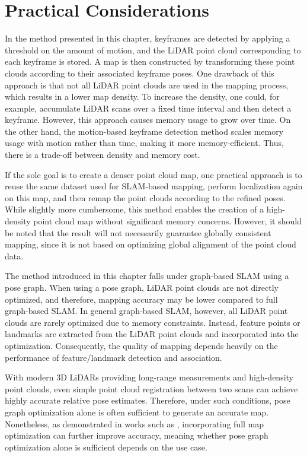 \section{Practical Considerations}

In the method presented in this chapter, keyframes are detected by applying a threshold on the amount of motion, and the LiDAR point cloud corresponding to each keyframe is stored.
A map is then constructed by transforming these point clouds according to their associated keyframe poses.
One drawback of this approach is that not all LiDAR point clouds are used in the mapping process, which results in a lower map density.
To increase the density, one could, for example, accumulate LiDAR scans over a fixed time interval and then detect a keyframe.
However, this approach causes memory usage to grow over time.
On the other hand, the motion-based keyframe detection method scales memory usage with motion rather than time, making it more memory-efficient.
Thus, there is a trade-off between density and memory cost.

If the sole goal is to create a denser point cloud map, one practical approach is to reuse the same dataset used for SLAM-based mapping, perform localization again on this map, and then remap the point clouds according to the refined poses.
While slightly more cumbersome, this method enables the creation of a high-density point cloud map without significant memory concerns.
However, it should be noted that the result will not necessarily guarantee globally consistent mapping, since it is not based on optimizing global alignment of the point cloud data.

The method introduced in this chapter falls under graph-based SLAM using a pose graph.
When using a pose graph, LiDAR point clouds are not directly optimized, and therefore, mapping accuracy may be lower compared to full graph-based SLAM.
In general graph-based SLAM, however, all LiDAR point clouds are rarely optimized due to memory constraints.
Instead, feature points or landmarks are extracted from the LiDAR point clouds and incorporated into the optimization.
Consequently, the quality of mapping depends heavily on the performance of feature/landmark detection and association.

With modern 3D LiDARs providing long-range measurements and high-density point clouds, even simple point cloud registration between two scans can achieve highly accurate relative pose estimates.
Therefore, under such conditions, pose graph optimization alone is often sufficient to generate an accurate map.
Nonetheless, as demonstrated in works such as \cite{KoideRAS2024}, incorporating full map optimization can further improve accuracy, meaning whether pose graph optimization alone is sufficient depends on the use case.

